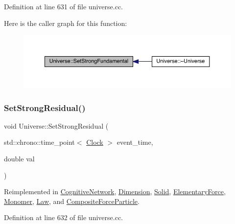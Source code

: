 Definition at line 631 of file universe.\+cc.

Here is the caller graph for this function\+:
\nopagebreak
\begin{figure}[H]
\begin{center}
\leavevmode
\includegraphics[width=350pt]{class_universe_aafec97a231126b71c73ac1258609a284_icgraph}
\end{center}
\end{figure}
\mbox{\label{class_universe_a1b2d6197ddf3d613cc30bd04d22ed8b7}} 
\subsubsection{\texorpdfstring{Set\+Strong\+Residual()}{SetStrongResidual()}}
{\footnotesize\ttfamily void Universe\+::\+Set\+Strong\+Residual (\begin{DoxyParamCaption}\item[{std\+::chrono\+::time\+\_\+point$<$ \hyperlink{universe_8h_a0ef8d951d1ca5ab3cfaf7ab4c7a6fd80}{Clock} $>$}]{event\+\_\+time,  }\item[{double}]{val }\end{DoxyParamCaption})\hspace{0.3cm}{\ttfamily [virtual]}}



Reimplemented in \hyperlink{class_cognitive_network_a6f7210dd8c2786518329faa61b6e14d5}{Cognitive\+Network}, \hyperlink{class_dimension_a9bd5480b1da689cd58bf61dac7169080}{Dimension}, \hyperlink{class_solid_a8b80ebe209fcd3afa4791968127753d0}{Solid}, \hyperlink{class_elementary_force_ac25021d38c1d54bf711096ab37a461f6}{Elementary\+Force}, \hyperlink{class_monomer_ae6ca57913da27fa749d33d1c4fed27ca}{Monomer}, \hyperlink{class_law_ad4a05c77d11ddec40b1e07246cac449d}{Law}, and \hyperlink{class_composite_force_particle_aeba1070d4ec6e52fd8276e38c6a6c2e1}{Composite\+Force\+Particle}.



Definition at line 632 of file universe.\+cc.

